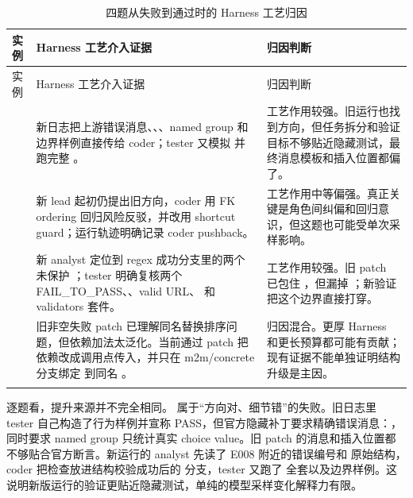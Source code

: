 \documentclass[UTF8,a4paper,11pt]{ctexart}
\begin{document}
\begin{center}
{\scriptsize
\setlength{\tabcolsep}{2pt}
\begin{longtable}{L{3.0cm} L{5.6cm} L{5.2cm}}
\toprule
实例 & Harness 工艺介入证据 & 归因判断 \\
\midrule
\endfirsthead
\toprule
实例 & Harness 工艺介入证据 & 归因判断 \\
\midrule
\endhead
{} & 新日志把上游错误消息、、、named group 和边界样例直接传给 coder；tester 又模拟  并跑完整 。 & 工艺作用较强。旧运行也找到方向，但任务拆分和验证目标不够贴近隐藏测试，最终消息模板和插入位置都偏了。 \\
 & 新 lead 起初仍提出旧方向，coder 用  FK ordering 回归风险反驳，并改用  shortcut guard；运行轨迹明确记录 coder pushback。 & 工艺作用中等偏强。真正关键是角色间纠偏和回归意识，但这题也可能受单次采样影响。 \\
 & 新 analyst 定位到 regex 成功分支里的两个未保护 ；tester 明确复核两个 FAIL\_TO\_PASS、、valid URL、 和 validators 套件。 & 工艺作用较强。旧 patch 已包住 ，但漏掉 ；新验证把这个边界直接打穿。 \\
 & 旧非空失败 patch 已理解同名替换排序问题，但依赖加法太泛化。当前通过 patch 把依赖改成调用点传入，并只在 m2m/concrete 分支绑定  到同名 。 & 归因混合。更厚 Harness 和更长预算都可能有贡献；现有证据不能单独证明结构升级是主因。 \\
\bottomrule
\caption{四题从失败到通过时的 Harness 工艺归因}
\end{longtable}
}
\end{center}

逐题看，提升来源并不完全相同。 属于“方向对、细节错”的失败。旧日志里 tester 自己构造了行为样例并宣称 PASS，但官方隐藏补丁要求精确错误消息：，同时要求 named group 只统计真实 choice value。旧 patch 的消息和插入位置都不够贴合官方断言。新运行的 analyst 先读了 E008 附近的错误编号和  原始结构，coder 把检查放进结构校验成功后的  分支，tester 又跑了  全套以及边界样例。这说明新版运行的验证更贴近隐藏测试，单纯的模型采样变化解释力有限。
\end{document}
